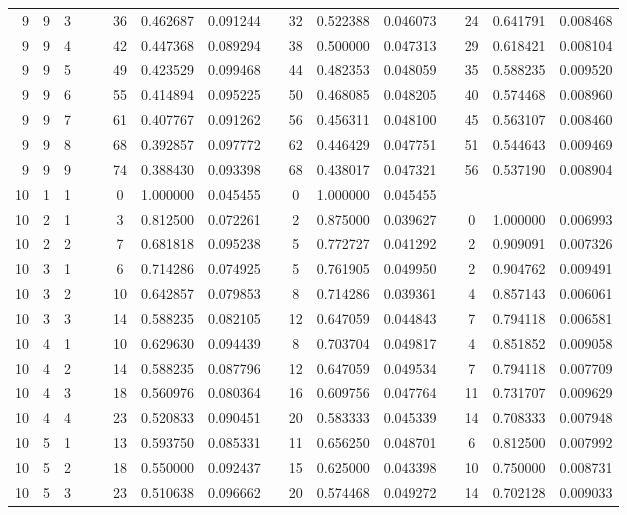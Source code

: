 \begin{appendix}
\begin{longtable}[h]{rrrccccccccccccc}
9	&	9	&	3	&&&	36	&	0.462687	&	0.091244	&&	32	&	0.522388	&	0.046073	&&	24	&	0.641791	&	0.008468	\\
9	&	9	&	4	&&&	42	&	0.447368	&	0.089294	&&	38	&	0.500000	&	0.047313	&&	29	&	0.618421	&	0.008104	\\
9	&	9	&	5	&&&	49	&	0.423529	&	0.099468	&&	44	&	0.482353	&	0.048059	&&	35	&	0.588235	&	0.009520	\\
9	&	9	&	6	&&&	55	&	0.414894	&	0.095225	&&	50	&	0.468085	&	0.048205	&&	40	&	0.574468	&	0.008960	\\
9	&	9	&	7	&&&	61	&	0.407767	&	0.091262	&&	56	&	0.456311	&	0.048100	&&	45	&	0.563107	&	0.008460	\\
9	&	9	&	8	&&&	68	&	0.392857	&	0.097772	&&	62	&	0.446429	&	0.047751	&&	51	&	0.544643	&	0.009469	\\
9	&	9	&	9	&&&	74	&	0.388430	&	0.093398	&&	68	&	0.438017	&	0.047321	&&	56	&	0.537190	&	0.008904	\\
10	&	1	&	1	&&&	0	&	1.000000	&	0.045455	&&	0	&	1.000000	&	0.045455	&&		&		&		\\
10	&	2	&	1	&&&	3	&	0.812500	&	0.072261	&&	2	&	0.875000	&	0.039627	&&	0	&	1.000000	&	0.006993	\\
10	&	2	&	2	&&&	7	&	0.681818	&	0.095238	&&	5	&	0.772727	&	0.041292	&&	2	&	0.909091	&	0.007326	\\
10	&	3	&	1	&&&	6	&	0.714286	&	0.074925	&&	5	&	0.761905	&	0.049950	&&	2	&	0.904762	&	0.009491	\\
10	&	3	&	2	&&&	10	&	0.642857	&	0.079853	&&	8	&	0.714286	&	0.039361	&&	4	&	0.857143	&	0.006061	\\
10	&	3	&	3	&&&	14	&	0.588235	&	0.082105	&&	12	&	0.647059	&	0.044843	&&	7	&	0.794118	&	0.006581	\\
10	&	4	&	1	&&&	10	&	0.629630	&	0.094439	&&	8	&	0.703704	&	0.049817	&&	4	&	0.851852	&	0.009058	\\
10	&	4	&	2	&&&	14	&	0.588235	&	0.087796	&&	12	&	0.647059	&	0.049534	&&	7	&	0.794118	&	0.007709	\\
10	&	4	&	3	&&&	18	&	0.560976	&	0.080364	&&	16	&	0.609756	&	0.047764	&&	11	&	0.731707	&	0.009629	\\
10	&	4	&	4	&&&	23	&	0.520833	&	0.090451	&&	20	&	0.583333	&	0.045339	&&	14	&	0.708333	&	0.007948	\\
10	&	5	&	1	&&&	13	&	0.593750	&	0.085331	&&	11	&	0.656250	&	0.048701	&&	6	&	0.812500	&	0.007992	\\
10	&	5	&	2	&&&	18	&	0.550000	&	0.092437	&&	15	&	0.625000	&	0.043398	&&	10	&	0.750000	&	0.008731	\\
10	&	5	&	3	&&&	23	&	0.510638	&	0.096662	&&	20	&	0.574468	&	0.049272	&&	14	&	0.702128	&	0.009033	\\

\end{longtable}
\end{appendix}
